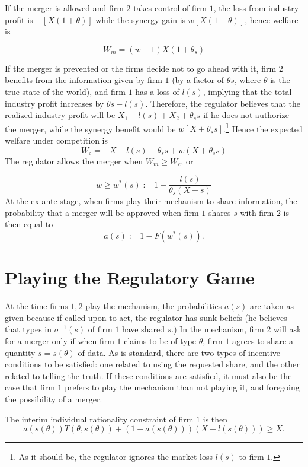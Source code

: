 \documentclass[a4paper]{article}
\renewcommand{\t}{\theta}
\begin{document}
    If the merger is allowed and firm $2$ takes control of firm $1$, the loss from industry profit is $-[X(1+\t)]$ while the synergy gain is $w[X(1+\t)]$, hence welfare is
    
    $$W_m=(w-1)X(1+\t_s)$$
    
    If the merger is prevented or the firms decide not to go ahead with it, firm $2$ benefits from the information given by firm $1$ (by a factor of $\t s$, where $\t$ is the true state of the world), and firm $1$ has a loss of $l(s)$, implying that the total industry profit increases by $\t s -l(s)$. Therefore, the regulator believes that the realized industry profit will be $X_1-l(s)+X_2+\t_s s$   if he does not authorize the merger, while the synergy benefit would be $w[X+\t_s s]$.\footnote{%
    As it should be, the regulator ignores the market loss $l(s)$ to firm $1$.} Hence the expected welfare under competition is
      $$W_c=-X+l(s)-\t_s s + w (X+\t_s s)$$
   The regulator allows the merger when $W_m\geq W_c$, or
    
    \begin{equation}
           w\geq w^*(s):=1 + \frac{l(s)}{\t_s(X-s)}
    \end{equation}
%
At the ex-ante stage, when firms play their mechanism to share information, the probability that a merger will be approved when firm $1$ shares $s$ with firm $2$ is then equal to  
\[
a(s):=1-F(w^*(s)).
\]

\section{Playing the Regulatory Game}
At the time firms $1,2$ play the mechanism, the probabilities $a(s)$  are taken as given because if called upon to act, the regulator has sunk beliefs (he believes that types in $\sigma^{-1}(s)$ of firm $1$ have shared $s$.) In the mechanism, firm $2$ will ask for a merger only if when firm $1$ claims to be of type $\t$, firm $1$ agrees to share a quantity $s=s(\t)$ of data. As is standard, there are two types of incentive conditions to be satisfied: one related to using the requested share, and the other related to telling the truth. If these conditions are satisfied, it must also be the case that firm $1$ prefers to play the mechanism than not playing it, and foregoing the possibility of a merger. 

The interim individual rationality constraint of firm $1$ is then
\begin{equation}\label{cond:IR}
    a(s(\t))T(\t,s(\t))+(1-a(s(\t)))(X-l(s(\t)))\geq X.   
\end{equation}
\end{document}
